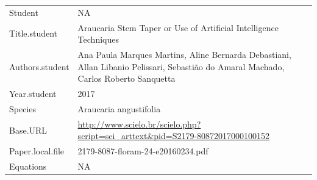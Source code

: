 \documentclass[]{article}
\begin{document}
\begin{longtable}[]{@{}ll@{}}
\toprule
\endhead
\begin{minipage}[t]{0.21\columnwidth}\raggedright
Student\strut
\end{minipage} & \begin{minipage}[t]{0.73\columnwidth}\raggedright
NA\strut
\end{minipage}\tabularnewline
\begin{minipage}[t]{0.21\columnwidth}\raggedright
Title.student\strut
\end{minipage} & \begin{minipage}[t]{0.73\columnwidth}\raggedright
Araucaria Stem Taper or Use of Artificial Intelligence Techniques\strut
\end{minipage}\tabularnewline
\begin{minipage}[t]{0.21\columnwidth}\raggedright
Authors.student\strut
\end{minipage} & \begin{minipage}[t]{0.73\columnwidth}\raggedright
Ana Paula Marques Martins, Aline Bernarda Debastiani, Allan Libanio
Pelissari, Sebastião do Amaral Machado, Carlos Roberto Sanquetta\strut
\end{minipage}\tabularnewline
\begin{minipage}[t]{0.21\columnwidth}\raggedright
Year.student\strut
\end{minipage} & \begin{minipage}[t]{0.73\columnwidth}\raggedright
2017\strut
\end{minipage}\tabularnewline
\begin{minipage}[t]{0.21\columnwidth}\raggedright
Species\strut
\end{minipage} & \begin{minipage}[t]{0.73\columnwidth}\raggedright
Araucaria angustifolia\strut
\end{minipage}\tabularnewline
\begin{minipage}[t]{0.21\columnwidth}\raggedright
Base.URL\strut
\end{minipage} & \begin{minipage}[t]{0.73\columnwidth}\raggedright
\url{http://www.scielo.br/scielo.php?script=sci_arttext\&pid=S2179-80872017000100152}\strut
\end{minipage}\tabularnewline
\begin{minipage}[t]{0.21\columnwidth}\raggedright
Paper.local.file\strut
\end{minipage} & \begin{minipage}[t]{0.73\columnwidth}\raggedright
2179-8087-floram-24-e20160234.pdf\strut
\end{minipage}\tabularnewline
\begin{minipage}[t]{0.21\columnwidth}\raggedright
Equations\strut
\end{minipage} & \begin{minipage}[t]{0.73\columnwidth}\raggedright
NA\strut
\end{minipage}\tabularnewline
\bottomrule
\end{longtable}
\end{document}
